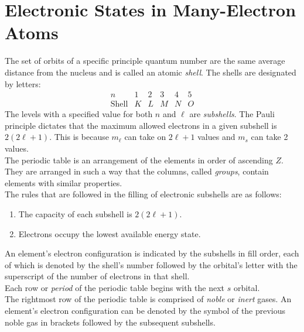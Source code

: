 \documentclass{subfiles}
\begin{document}
		\section{Electronic States in Many-Electron Atoms}
			The set of orbits of a specific principle quantum number are the same average distance from the nucleus and is called an atomic \textit{shell}. The shells are designated by letters:
				\[\begin{array}{*{6}{l}}
					n & 1 & 2 & 3 & 4 & 5 \\
					\text{Shell} & K & L & M & N & O
				\end{array}\]
				The levels with a specified value for both \(n\) and \(\ell\) are \textit{subshells}. The Pauli principle dictates that the maximum allowed electrons in a given subshell is \(2(2\ell + 1)\). This is because \(m_\ell\) can take on \(2\ell + 1\) values and \(m_s\) can take 2 values. \\
					The periodic table is an arrangement of the elements in order of ascending \(Z\). They are arranged in such a way that the columns, called \textit{groups}, contain elements with similar properties. \\
					The rules that are followed in the filling of electronic subshells are as follows:
						\begin{enumerate}
							\item 
								The capacity of each subshell is \(2(2\ell + 1)\).
							\item
								Electrons occupy the lowest available energy state.
						\end{enumerate}
						An element's electron configuration is indicated by the subshells in fill order, each of which is denoted by the shell's number followed by the orbital's letter with the superscript of the number of electrons in that shell. \\
						Each row or \textit{period} of the periodic table begins with the next \(s\) orbital. \\
						The rightmost row of the periodic table is comprised of \textit{noble} or \textit{inert} gases. An element's electron configuration can be denoted by the symbol of the previous noble gas in brackets followed by the subsequent subshells.
\end{document}
